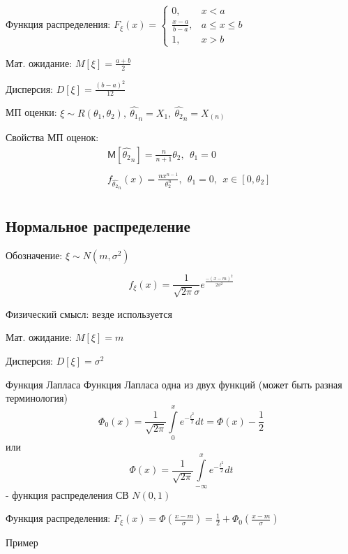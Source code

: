 \documentclass[12pt]{article}
\newcommand{\M}{\mathsf{M}}
\begin{document}
\par Функция распределения: $F_{\xi}(x)=\left\{\begin{array}{ll}
        0, & x<a
        \\ \frac{x-a}{b-a}, & a\leqslant x\leqslant b
        \\ 1, & x>b
\end{array}\right.$
\par Мат. ожидание: $M[\xi]=\frac{a+b}{2}$
\par Дисперсия: $D[\xi]=\frac{(b-a)^{2}}{12}$
\par МП оценки: $\xi\sim R(\theta_{1},\theta_{2}),
\ \widehat{\theta_{1}}_{n} = X_{1},
\ \widehat{\theta_{2}}_{n} = X_{(n)}$
\par Свойства МП оценок:
\begin{eqnarray*}
    & & \M [\widehat{\theta_{2}}_{n}] = \frac{n}{n+1}\theta_{2}
    ,\ \ \theta_{1}=0\\
    \\& & f_{\widehat{\theta_{2}}_{n}}(x)=\frac{nx^{n-1}}{\theta_{2}^{n}}
    ,\ \ \theta_{1}=0,\ \ x\in \left[0,\theta_{2}\right]\\
\end{eqnarray*}




\newpage
\subsection{Нормальное распределение}
\par Обозначение: $\xi \sim N(m,\sigma^{2})$
\par \[
    f_{\xi}(x)=\frac{1}{\sqrt{2\pi}\sigma}e^{\frac{-(x-m)^{2}}{2\sigma^{2}}}
\]
\par Физический смысл: везде используется
\par Мат. ожидание: $M[\xi]=m$
\par Дисперсия: $D[\xi]=\sigma^{2}$
\begin{definition}
    {Функция Лапласа}
    {Функция Лапласа}
    одна из двух функций (может быть разная терминология)
    \begin{displaymath}
        \Phi_{0}(x)=\frac{1}{\sqrt{2\pi}}\int\limits_{0}^{x}e^{-\frac{t^{2}}{2}}dt
        =\Phi(x)-\frac{1}{2}
    \end{displaymath}
    или
    \begin{displaymath}
        \Phi(x)=\frac{1}{\sqrt{2\pi}}\int\limits_{-\infty}^{x}e^{-\frac{t^{2}}{2}}dt
    \end{displaymath}
    - функция распределения СВ $N(0,1)$
\end{definition}
\par Функция распределения:
$F_{\xi}(x)
=\Phi\left(\frac{x-m}{\sigma}\right)
=\frac{1}{2}+\Phi_{0}\left(\frac{x-m}{\sigma}\right)$
\par Пример
\end{document}
